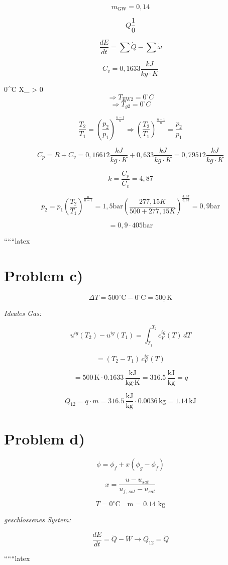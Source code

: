 \[
m_{\text{GW}} = 0,14
\]

\[
Q \frac{1}{0}
\]


\[
\frac{dE}{dt} = \sum \dot{Q} - \sum \dot{\omega}
\]

\[
C_v = 0,1633 \frac{kJ}{kg \cdot K}
\]

 0^\circ C \quad X_{} > 0
\[
\Rightarrow T_{\text{EW2}} = 0^\circ C
\]
\[
\Rightarrow T_{g2} = 0^\circ C
\]


\[
\frac{T_2}{T_1} = \left( \frac{p_2}{p_1} \right)^{\frac{n-1}{n}} \Rightarrow \left( \frac{T_2}{T_1} \right)^{\frac{n-1}{n}} = \frac{p_2}{p_1}
\]

\[
C_p = R + C_v = 0,16612 \frac{kJ}{kg \cdot K} + 0,633 \frac{kJ}{kg \cdot K} = 0,79512 \frac{kJ}{kg \cdot K}
\]

\[
k = \frac{C_p}{C_v} = 4,87
\]

\[
p_2 = p_1 \left( \frac{T_2}{T_1} \right)^{\frac{n}{n-1}} = 1,5 \text{bar} \left( \frac{277,15 K}{500 + 277,15 K} \right)^{\frac{4,87}{3,87}} = 0,9 \text{bar}
\]

\[
= 0,9 \cdot 405 \text{bar}
\]

``````latex


\section*{Problem c)}

\[
\Delta T = 500^\circ \text{C} - 0^\circ \text{C} = \underline{500 \, \text{K}}
\]

\textit{Ideales Gas:}

\[
u^{ig}(T_2) - u^{ig}(T_1) = \int_{T_1}^{T_2} c_V^{ig}(T) \, dT
\]

\[
= (T_2 - T_1) \, c_V^{ig}(T)
\]

\[
= 500 \, \text{K} \cdot 0.1633 \, \frac{\text{kJ}}{\text{kg} \cdot \text{K}} = 316.5 \, \frac{\text{kJ}}{\text{kg}} = q
\]

\[
Q_{12} = q \cdot m = 316.5 \, \frac{\text{kJ}}{\text{kg}} \cdot 0.0036 \, \text{kg} = \underline{1.14 \, \text{kJ}}
\]

\section*{Problem d)}

\[
\phi = \phi_f + x \left( \phi_g - \phi_f \right)
\]

\[
x = \frac{u - u_{sat}}{u_{f, \, sat} - u_{sat}}
\]

\[
T = 0^\circ \text{C} \quad \text{m = 0.14 kg}
\]

\textit{geschlossenes System:}

\[
\frac{dE}{dt} = \dot{Q} - \dot{W} \rightarrow Q_{12} = \dot{Q}
\]

``````latex


